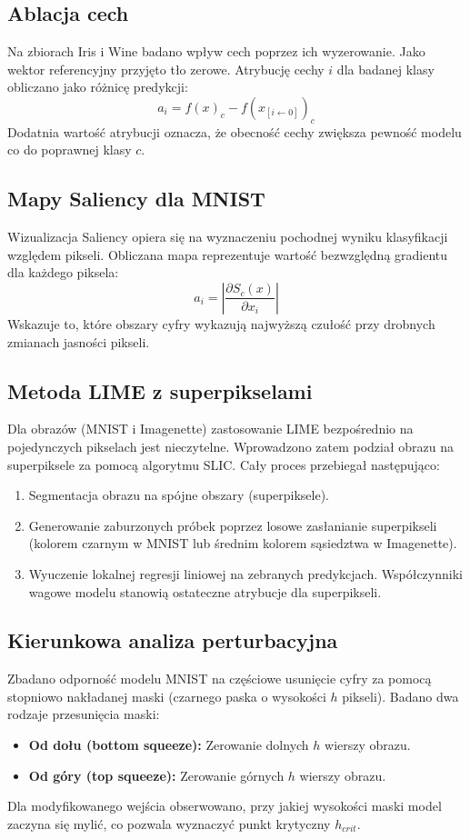 \documentclass[10pt,journal,compsoc]{IEEEtran}
\begin{document}
\subsection{Ablacja cech}
Na zbiorach Iris i Wine badano wpływ cech poprzez ich wyzerowanie. Jako wektor referencyjny przyjęto tło zerowe. Atrybucję cechy $i$ dla badanej klasy obliczano jako różnicę predykcji:
\begin{equation}
a_i = f(x)_c - f(x_{[i \leftarrow 0]})_c
\end{equation}
Dodatnia wartość atrybucji oznacza, że obecność cechy zwiększa pewność modelu co do poprawnej klasy $c$.

\subsection{Mapy Saliency dla MNIST}
Wizualizacja Saliency opiera się na wyznaczeniu pochodnej wyniku klasyfikacji względem pikseli. Obliczana mapa reprezentuje wartość bezwzględną gradientu dla każdego piksela:
\begin{equation}
a_i = \left| \frac{\partial S_c(x)}{\partial x_i} \right|
\end{equation}
Wskazuje to, które obszary cyfry wykazują najwyższą czułość przy drobnych zmianach jasności pikseli.

\subsection{Metoda LIME z superpikselami}
Dla obrazów (MNIST i Imagenette) zastosowanie LIME bezpośrednio na pojedynczych pikselach jest nieczytelne. Wprowadzono zatem podział obrazu na superpiksele za pomocą algorytmu SLIC. Cały proces przebiegał następująco:
\begin{enumerate}
    \item Segmentacja obrazu na spójne obszary (superpiksele).
    \item Generowanie zaburzonych próbek poprzez losowe zasłanianie superpikseli (kolorem czarnym w MNIST lub średnim kolorem sąsiedztwa w Imagenette).
    \item Wyuczenie lokalnej regresji liniowej na zebranych predykcjach. Współczynniki wagowe modelu stanowią ostateczne atrybucje dla superpikseli.
\end{enumerate}

\subsection{Kierunkowa analiza perturbacyjna}
Zbadano odporność modelu MNIST na częściowe usunięcie cyfry za pomocą stopniowo nakładanej maski (czarnego paska o wysokości $h$ pikseli). Badano dwa rodzaje przesunięcia maski:
\begin{itemize}
    \item \textbf{Od dołu (bottom squeeze):} Zerowanie dolnych $h$ wierszy obrazu.
    \item \textbf{Od góry (top squeeze):} Zerowanie górnych $h$ wierszy obrazu.
\end{itemize}
Dla modyfikowanego wejścia obserwowano, przy jakiej wysokości maski model zaczyna się mylić, co pozwala wyznaczyć punkt krytyczny $h_{crit}$.
\end{document}

